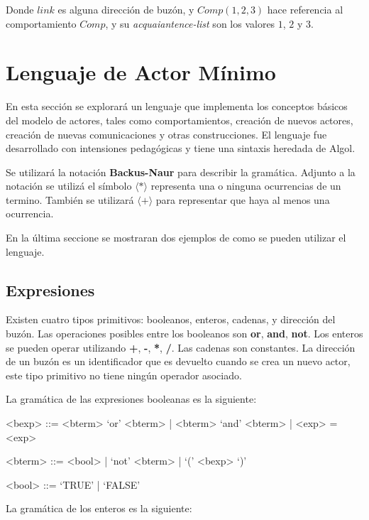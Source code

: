 Donde $link$ es alguna dirección de buzón, y $Comp(1,2,3)$ hace referencia al comportamiento $Comp$, y su \textit{acquaiantence-list} son los valores $1$, $2$ y $3$.

\section{Lenguaje de Actor Mínimo}\label{actores:sal}

En esta sección se explorará un lenguaje que implementa los conceptos básicos del modelo de actores, tales como comportamientos, creación de nuevos actores, creación de nuevas comunicaciones y otras construcciones. El lenguaje \SAL fue desarrollado con intensiones pedagógicas y tiene una sintaxis heredada de Algol. 

Se utilizará la notación \textbf{Backus-Naur}\cite{McCracken:2003:BF:1074100.1074155} para describir la gramática. Adjunto a la notación se utilizá el símbolo $\langle \textbf{*} \rangle$ representa una o ninguna ocurrencias de un termino. También se utilizará $\langle \textbf{+} \rangle$ para representar que haya al menos una ocurrencia.

En la última seccione se mostraran dos ejemplos de como se pueden utilizar el lenguaje.

\subsection{Expresiones}\label{actores:exp}
Existen cuatro tipos primitivos: booleanos, enteros, cadenas, y dirección del buzón. Las operaciones posibles entre los booleanos son \textbf{or}, \textbf{and}, \textbf{not}. Los enteros se pueden operar utilizando \textbf{+}, \textbf{-}, \textbf{*}, \textbf{/}. Las cadenas son constantes. La dirección de un buzón es un identificador que es devuelto cuando se crea un nuevo actor, este tipo primitivo no tiene ningún operador asociado.

La gramática de las expresiones booleanas es la siguiente:

\begin{grammar}

<bexp> ::= <bterm> `or' <bterm> | <bterm> `and' <bterm> | <exp> = <exp>
  
<bterm> ::= <bool> | `not' <bterm> | `(' <bexp> `)' 

<bool> ::= `TRUE' | `FALSE'

\end{grammar}

La gramática de los enteros es la siguiente:

